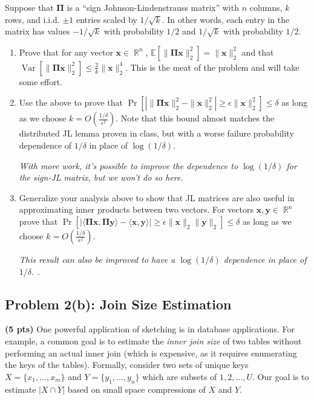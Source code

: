 \documentclass[10pt]{article}
\DeclareMathOperator{\R}{\mathbb{R}}
\newcommand{\E}{\mathbb{E}}
\DeclareMathOperator{\Var}{Var}
\newcommand{\bs}[1]{\boldsymbol{#1}}
\newcommand{\bv}[1]{\mathbf{#1}}
\begin{document}
Suppose that $\bs{\Pi}$ is a ``sign Johnson-Lindenstrauss matrix'' with $n$ columns, $k$ rows, and i.i.d. $\pm 1$ entries scaled by $1/\sqrt{k}$. In other words, each entry in the matrix has values $-1/\sqrt{k}$ with probability $1/2$ and $1/\sqrt{k}$ with probability $1/2$.
\begin{enumerate}
	\item Prove that for any vector $\bv{x}\in \R^n$, $\E[\|\bs{\Pi}\bv{x}\|_2^2] = \|\bv{x}\|_2^2$ and that $\Var[\|\bs{\Pi}\bv{x}\|_2^2] \leq \frac{2}{k}\|\bv{x}\|_2^4$. This is the meat of the problem and will take some effort. 
	\vspace{.5em}

	
	\item Use the above to prove that $\Pr\left[\left|\|\bs{\Pi}\bv{x}\|_2^2 - \|\bv{x}\|_2^2\right| \geq \epsilon\|\bv{x}\|_2^2 \right] \leq \delta$ as long as we choose $k = O\left(\frac{1/\delta}{\epsilon^2}\right)$. Note that this bound almost matches the distributed JL lemma proven in class, but with a worse failure probability dependence of $1/\delta$ in place of $\log(1/\delta)$. 
	\vspace{.5em}
	
	\textit{With more work, it's possible to improve the dependence to $\log(1/\delta)$ for the sign-JL matrix, but we won't do so here.}
	
	\item Generalize your analysis above to show that JL matrices are also useful in approximating inner products between two vectors. For vectors $\bv{x},\bv{y}\in \R^n$ prove that $\Pr\left[\left|\langle \bs{\Pi}\bv{x}, \bs{\Pi}\bv{y}\rangle -  \langle  \bv{x}, \bv{y}\rangle\right| \geq \epsilon\|\bv{x}\|_2\|\bv{y}\|_2\right] \leq \delta$ as long as we choose $k = O\left(\frac{1/\delta}{\epsilon^2}\right)$.
	
		\textit{This result can also be improved to have a $\log(1/\delta)$ dependence in place of $1/\delta$. .}
\end{enumerate}

\subsection{Problem 2(b): Join Size Estimation}
\noindent\textbf{(5 pts)}
One powerful application of sketching is in database applications. For example, a common goal is to estimate the \emph{inner join size} of two tables without performing an actual inner join (which is expensive, as it requires enumerating the keys of the tables). Formally, consider two sets of unique keys $X = \{x_1, \ldots, x_m\}$ and $Y = \{y_1, \ldots, y_n\}$ which are subsets of $1,2, \ldots, U$.  Our goal is to estimate $|X\cap Y|$ based on small space compressions of $X$ and $Y$.  
\end{document}
